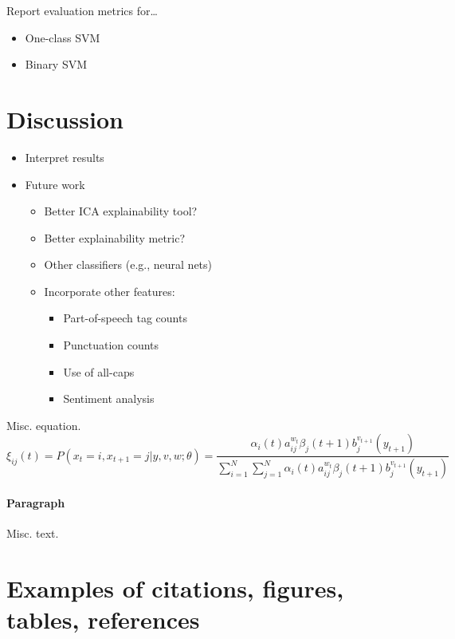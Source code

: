 \documentclass{article}
\begin{document}
\label{sec:results} Report evaluation metrics for\ldots{}

\begin{itemize}
\tightlist
\item
  One-class SVM
\item
  Binary SVM
\end{itemize}

\hypertarget{discussion}{%
\section{Discussion}\label{discussion}}

\label{sec:discuss}

\begin{itemize}
\tightlist
\item
  Interpret results
\item
  Future work

  \begin{itemize}
  \tightlist
  \item
    Better ICA explainability tool?
  \item
    Better explainability metric?
  \item
    Other classifiers (e.g., neural nets)
  \item
    Incorporate other features:

    \begin{itemize}
    \tightlist
    \item
      Part-of-speech tag counts
    \item
      Punctuation counts
    \item
      Use of all-caps
    \item
      Sentiment analysis
    \end{itemize}
  \end{itemize}
\end{itemize}

Misc. equation. \[
\xi _{ij}(t)=P(x_{t}=i,x_{t+1}=j|y,v,w;\theta)= {\frac {\alpha _{i}(t)a^{w_t}_{ij}\beta _{j}(t+1)b^{v_{t+1}}_{j}(y_{t+1})}{\sum _{i=1}^{N} \sum _{j=1}^{N} \alpha _{i}(t)a^{w_t}_{ij}\beta _{j}(t+1)b^{v_{t+1}}_{j}(y_{t+1})}}
\]

\paragraph{Paragraph}

Misc. text.

\hypertarget{examples-of-citations-figures-tables-references}{%
\section{Examples of citations, figures, tables,
references}\label{examples-of-citations-figures-tables-references}}
\end{document}
